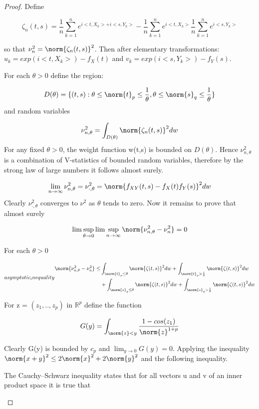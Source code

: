 \begin{proof}
Define 

$$
\zeta_{n}(t,s) = \frac{1}{n}\sum_{k=1}^{n}e^{i<t,X_{k}>+i<s,Y_{k}>}- \frac{1}{n}\sum_{k=1}^{n}e^{i<t,X_{k}>}\frac{1}{n}\sum_{k=1}^{n}e^{i<s,Y_{k}>}
$$

so that $\nu^{2}_{n} = \norm{\zeta_{n}(t,s)}^{2}$. Then after elementary transformations: $u_{k} = exp(i<t,X_{k}>)-f_{X}(t)$ and $v_{k} = exp(i<s,Y_{k}>)-f_{Y}(s)$.

For each $\theta>0$ define the region:

$$
D(\theta) = \{(t,s):\theta\leq\norm{t}_{p}\leq\frac{1}{\theta}, \theta\leq\norm{s}_{q}\leq\frac{1}{\theta}\}
$$ 
and random variables 

$$
\nu^{2}_{n,\theta} = \int_{D(\theta)}\norm{\zeta_{n}(t,s)}^{2}dw
$$
For any fixed $\theta>0$, the weight function w(t,s) is bounded on $D(\theta)$. Hence $\nu^{2}_{n,\theta}$ is a combination of V-statistics of bounded random variables, therefore by the strong law of large numbers
it follows almost surely.

$$
\lim_{n\to\infty}\nu^{2}_{n,\theta} = \nu^{2}_{\cdot,\theta} = \norm{f_{XY}(t,s) - f_{X}(t)f_{Y}(s)}^{2}dw
$$
Clearly $\nu^{2}_{\cdot,\theta}$ converges to $\nu^{2}$ as $\theta$ tends to zero. Now it remains to prove that almost surely

$$
\lim\sup_{\theta \to 0} \lim\sup_{n \to \infty} \norm{\nu^{2}_{n,\theta}-\nu^{2}_{n}} = 0
$$

For each $\theta>0$

\begin{equation}{asymptotic_inequality}
\begin{split}
\norm{\nu^{2}_{n,\theta} - \nu^{2}_{n}} \leq &
\int_{\norm{t}_{p}\leq\theta}\norm{\zeta(t,s)}^{2}dw + \int_{\norm{t}_{p}>\frac{1}{\theta}}\norm{\zeta(t,s)}^{2}dw \\
& + \int_{\norm{s}_{q}\leq\theta}\norm{\zeta(t,s)}^{2}dw + \int_{\norm{s}_{q}>\frac{1}{\theta}}\norm{\zeta(t,s)}^{2}dw
\end{split}
\end{equation}

For z = $(z_{1},..,z_{p})$ in $\mathbb{R}^{p}$ define the function

$$
G(y) = \int_{\norm{z}<y} \frac{1-cos(z_{1})}{\norm{z}^{1+p}}
$$

Clearly G(y) is bounded by $c_{p}$ and $\lim_{y\to0}G(y) = 0$. Applying the inequality $\norm{x+y}^{2}\leq2\norm{x}^{2}+2\norm{y}^{2}$ and the following inequality.
\begin{prop}
The Cauchy–Schwarz inequality states that for all vectors u and v of an inner product space it is true that


\end{prop}
\end{proof}
